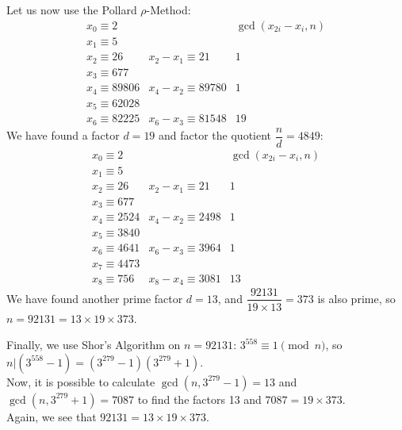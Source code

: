 \documentclass[11pt]{article}
\begin{document}
Let us now use the Pollard $\rho$-Method:
\[
  \begin{array}{llc}
    x_0   \equiv 2     &                        & \gcd(x_{2i} - x_i, n)\\
    x_1   \equiv 5\\
    x_2   \equiv 26    & x_2 - x_1 \equiv    21 &                  1\\
    x_3   \equiv 677\\
    x_4   \equiv 89806 & x_4 - x_2 \equiv 89780 &                  1\\
    x_5   \equiv 62028\\
    x_6   \equiv 82225 & x_6 - x_3 \equiv 81548 &                 19
  \end{array}
\]
We have found a factor $d = 19$ and factor the quotient $\dfrac{n}{d} = 4849$:
\[
  \begin{array}{llc}
    x_0   \equiv    2 &                       & \gcd(x_{2i} - x_i, n)\\
    x_1   \equiv    5 \\
    x_2   \equiv   26 & x_2 - x_1 \equiv   21 &                  1\\
    x_3   \equiv  677 \\
    x_4   \equiv 2524 & x_4 - x_2 \equiv 2498 &                  1\\
    x_5   \equiv 3840 \\
    x_6   \equiv 4641 & x_6 - x_3 \equiv 3964 &                  1\\
    x_7   \equiv 4473 \\
    x_8   \equiv  756 & x_8 - x_4 \equiv 3081 &                 13
  \end{array}
\]
We have found another prime factor $d = 13$,
and $\dfrac{92131}{19\times 13} = 373$ is also prime,
so $n = 92131 = 13\times 19\times 373$.

Finally, we use Shor's Algorithm on $n = 92131$: 
$3^{558}\equiv 1\pmod{n}$,
so
$n | (3^{558}-1) = (3^{279} - 1)(3^{279} + 1)$.\\
Now, it is possible to calculate $\gcd(n,3^{279} - 1) = 13$ 
and $\gcd(n,3^{279} + 1) = 7087$ to find the factors 13 
and $7087 = 19\times 373$.\\
Again, we see that $92131 = 13\times 19\times 373$.
\end{document}
